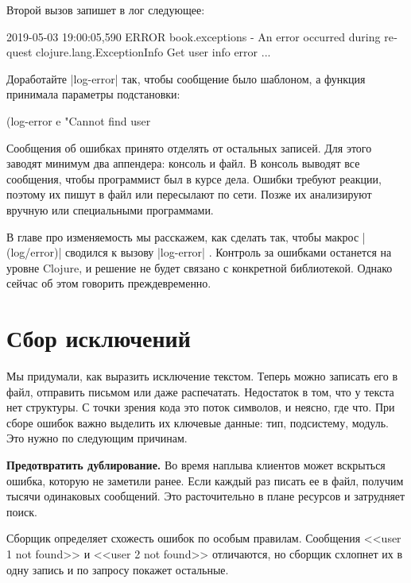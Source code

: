 Второй вызов запишет в лог следующее:

\begin{english}
  \begin{text}
2019-05-03 19:00:05,590 ERROR book.exceptions - An error occurred during request
clojure.lang.ExceptionInfo
  Get user info error
  ...
  \end{text}
\end{english}

Доработайте \spverb|log-error| так, чтобы сообщение было шаблоном, а функция
принимала параметры подстановки:

\begin{english}
  \begin{clojure}
(log-error e "Cannot find user %
  \end{clojure}
\end{english}

Сообщения об ошибках принято отделять от остальных записей. Для этого заводят
минимум два аппендера: консоль и файл. В консоль выводят все сообщения, чтобы
программист был в курсе дела. Ошибки требуют реакции, поэтому их пишут в файл
или пересылают по сети. Позже их анализируют вручную или специальными
программами.

В главе про изменяемость мы расскажем, как сделать так, чтобы макрос
\spverb|(log/error)| сводился к вызову \spverb|log-error| .
Контроль за ошибками останется на уровне Clojure, и решение не будет связано с
конкретной библиотекой. Однако сейчас об этом говорить преждевременно.

\section{Сбор исключений}

Мы придумали, как выразить исключение текстом. Теперь можно записать его в файл,
отправить письмом или даже распечатать. Недостаток в том, что у текста нет
структуры. С точки зрения кода это поток символов, и неясно, где что. При сборе
ошибок важно выделить их ключевые данные: тип, подсистему, модуль. Это нужно по
следующим причинам.

\textbf{Предотвратить дублирование.} Во время наплыва клиентов может вскрыться
ошибка, которую не заметили ранее. Если каждый раз писать ее в файл, получим
тысячи одинаковых сообщений. Это расточительно в плане ресурсов и затрудняет
поиск.

Сборщик определяет схожесть ошибок по особым правилам. Сообщения <<user 1 not
found>> и <<user 2 not found>> отличаются, но сборщик схлопнет их в одну запись
и по запросу покажет остальные.

